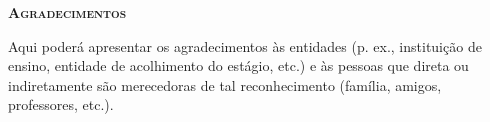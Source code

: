 
\vspace*{45pt}
\begin{flushleft}
	{\Large \textbf{\scshape{Agradecimentos}}}
\end{flushleft}
\vspace*{10pt}

Aqui poderá apresentar  os agradecimentos às entidades (p. ex., instituição de ensino, entidade de acolhimento do estágio, etc.) e às pessoas que direta ou indiretamente são merecedoras de tal reconhecimento (família, amigos, professores, etc.).